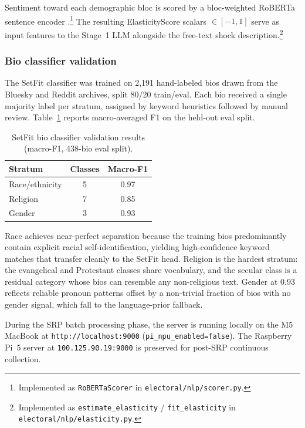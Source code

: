 \documentclass[12pt, letterpaper]{article}
\theoremstyle{definition}
\begin{document}
Sentiment toward each demographic bloc is scored by a bloc-weighted RoBERTa
sentence encoder \citep{Liu2019}.\footnote{Implemented as \texttt{RoBERTaScorer}
in \texttt{electoral/nlp/scorer.py}.} The resulting ElasticityScore scalars
$\in [-1, 1]$ serve as input features to the Stage~1 LLM alongside the
free-text shock description.\footnote{Implemented as \texttt{estimate\_elasticity}
/ \texttt{fit\_elasticity} in \texttt{electoral/nlp/elasticity.py}.}

\subsubsection{Bio classifier validation}
\label{sec:bio_val}

The SetFit classifier was trained on 2,191 hand-labeled bios drawn from the
Bluesky and Reddit archives, split 80/20 train/eval.  Each bio received a
single majority label per stratum, assigned by keyword heuristics followed by
manual review.  Table~\ref{tab:setfit_f1} reports macro-averaged F1 on the
held-out eval split.

\begin{table}[h]
\centering
\caption{SetFit bio classifier validation results (macro-F1, 438-bio eval split).}
\label{tab:setfit_f1}
\begin{tabular}{lcc}
\toprule
Stratum & Classes & Macro-F1 \\
\midrule
Race/ethnicity  & 5 & 0.97 \\
Religion        & 7 & 0.85 \\
Gender          & 3 & 0.93 \\
\bottomrule
\end{tabular}
\end{table}

Race achieves near-perfect separation because the training bios predominantly
contain explicit racial self-identification, yielding high-confidence keyword
matches that transfer cleanly to the SetFit head.  Religion is the hardest
stratum: the evangelical and Protestant classes share vocabulary, and the
secular class is a residual category whose bios can resemble any non-religious
text.  Gender at 0.93 reflects reliable pronoun patterns offset by a
non-trivial fraction of bios with no gender signal, which fall to the
language-prior fallback.

During the SRP batch processing phase, the server is running locally on the
M5 MacBook at \texttt{http://localhost:9000} (\texttt{pi\_npu\_enabled=false}).
The Raspberry Pi~5 server at \texttt{100.125.90.19:9000} is preserved for
post-SRP continuous collection.
\end{document}
